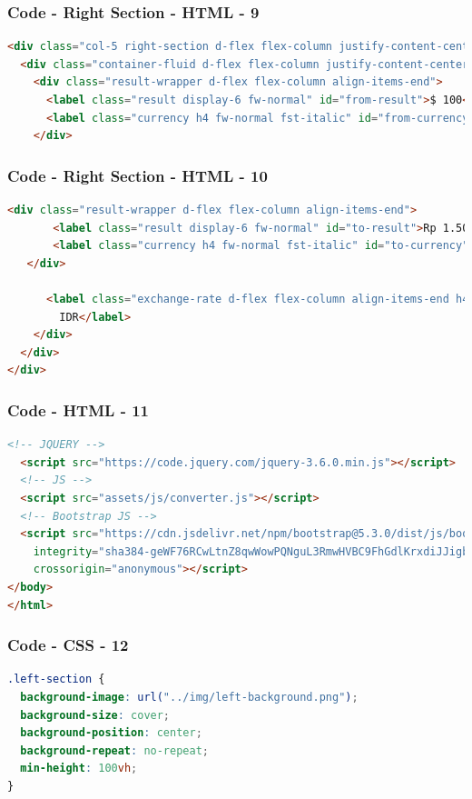 \documentclass[aspectratio=169, table]{beamer}
\begin{document}
\begin{frame}[fragile]
    \frametitle{Code - Right Section - HTML - 9}
    \vskip1cm
    \begin{lstlisting}[language=HTML]
<div class="col-5 right-section d-flex flex-column justify-content-center text-light">
  <div class="container-fluid d-flex flex-column justify-content-center text-light">
    <div class="result-wrapper d-flex flex-column align-items-end">
      <label class="result display-6 fw-normal" id="from-result">$ 100</label>
      <label class="currency h4 fw-normal fst-italic" id="from-currency">USD</label>
    </div>
    \end{lstlisting}
\end{frame}

\begin{frame}[fragile]
    \frametitle{Code - Right Section - HTML - 10}
    \vskip1cm
    \begin{lstlisting}[language=HTML]
   <div class="result-wrapper d-flex flex-column align-items-end">
       <label class="result display-6 fw-normal" id="to-result">Rp 1.500.000</label>
       <label class="currency h4 fw-normal fst-italic" id="to-currency">IDR</label>
   </div>
      
      <label class="exchange-rate d-flex flex-column align-items-end h4 fw-normal" id="exchange-rate">1 USD = 15.000
        IDR</label>
    </div>
  </div>
</div>
    \end{lstlisting}
\end{frame}

\begin{frame}[fragile]
    \frametitle{Code - HTML - 11}
    \vskip1cm
    \begin{lstlisting}[language=HTML]
  <!-- JQUERY -->
  <script src="https://code.jquery.com/jquery-3.6.0.min.js"></script>
  <!-- JS -->
  <script src="assets/js/converter.js"></script>
  <!-- Bootstrap JS -->
  <script src="https://cdn.jsdelivr.net/npm/bootstrap@5.3.0/dist/js/bootstrap.bundle.min.js"
    integrity="sha384-geWF76RCwLtnZ8qwWowPQNguL3RmwHVBC9FhGdlKrxdiJJigb/j/68SIy3Te4Bkz"
    crossorigin="anonymous"></script>
</body>
</html>
    \end{lstlisting}
\end{frame}

\begin{frame}[fragile]
    \frametitle{Code - CSS - 12}
    \vskip1cm
    \begin{lstlisting}[language=CSS]
.left-section {
  background-image: url("../img/left-background.png");
  background-size: cover;
  background-position: center;
  background-repeat: no-repeat;
  min-height: 100vh;
}
    \end{lstlisting}
\end{frame}
\end{document}
